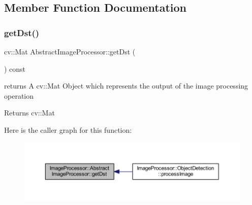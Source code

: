\subsection{Member Function Documentation}
\mbox{\label{class_image_processor_1_1_abstract_image_processor_acbf98498ebece7b9f339222097a3429a}} 
\subsubsection{\texorpdfstring{get\+Dst()}{getDst()}}
{\footnotesize\ttfamily cv\+::\+Mat Abstract\+Image\+Processor\+::get\+Dst (\begin{DoxyParamCaption}{ }\end{DoxyParamCaption}) const}



returns A cv\+::\+Mat Object which represents the output of the image processing operation 

\begin{DoxyReturn}{Returns}
cv\+::\+Mat 
\end{DoxyReturn}
Here is the caller graph for this function\+:\nopagebreak
\begin{figure}[H]
\begin{center}
\leavevmode
\includegraphics[width=350pt]{dc/d61/class_image_processor_1_1_abstract_image_processor_acbf98498ebece7b9f339222097a3429a_icgraph}
\end{center}
\end{figure}
\mbox{\label{class_image_processor_1_1_abstract_image_processor_a904d1619b2c6be2c5382469325ca43e3}} 
